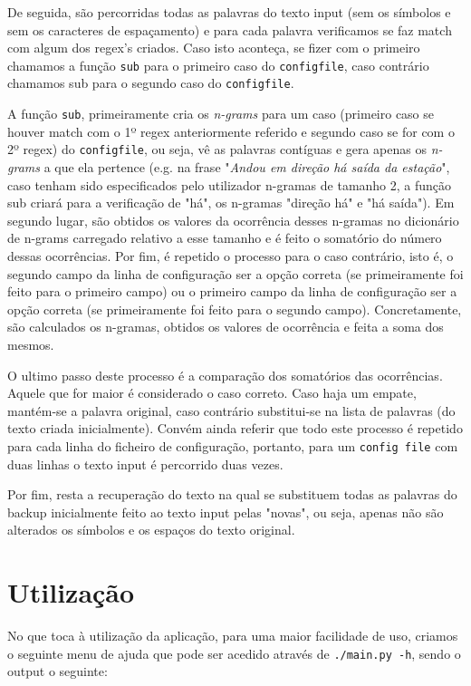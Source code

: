 \documentclass{article}
\begin{document}
De seguida, são percorridas todas as palavras do texto input (sem os símbolos e sem os caracteres de espaçamento) e para cada palavra verificamos se faz match com algum dos regex's criados. Caso isto aconteça, se fizer com o primeiro chamamos a função \texttt{sub} para o primeiro caso do \texttt{configfile}, caso contrário chamamos sub para o segundo caso do \texttt{configfile}.

A função \texttt{sub}, primeiramente cria os \textit{n-grams} para um caso (primeiro caso se houver match com o 1º regex anteriormente referido e segundo caso se for com o 2º regex) do \texttt{configfile}, ou seja, vê as palavras contíguas e gera apenas os \textit{n-grams} a que ela pertence (e.g. na frase "\textit{Andou em direção há saída da estação}", caso tenham sido especificados pelo utilizador n-gramas de tamanho 2, a função sub criará para a verificação de "há", os n-gramas "direção há" e "há saída"). Em segundo lugar, são obtidos os valores da ocorrência desses n-gramas no dicionário de n-grams carregado relativo a esse tamanho e é feito o somatório do número dessas ocorrências. Por fim, é repetido o processo para o caso contrário, isto é, o segundo campo da linha de configuração ser a opção correta (se primeiramente foi feito para o primeiro campo) ou o primeiro campo da linha de configuração ser a opção correta (se primeiramente foi feito para o segundo campo). Concretamente, são calculados os n-gramas, obtidos os valores de ocorrência e feita a soma dos mesmos.

O ultimo passo deste processo é a comparação dos somatórios das ocorrências. Aquele que for maior é considerado o caso correto. Caso haja um empate, mantém-se a palavra original, caso contrário substitui-se na lista de palavras (do texto criada inicialmente). Convém ainda referir que todo este processo é repetido para cada linha do ficheiro de configuração, portanto, para um \texttt{config file} com duas linhas o texto input é percorrido duas vezes.

Por fim, resta a recuperação do texto na qual se substituem todas as palavras do backup inicialmente feito ao texto input pelas "novas", ou seja, apenas não são alterados os símbolos e os espaços do texto original.



\section{Utilização}\label{usage}
No que toca à utilização da aplicação, para uma maior facilidade de uso, criamos o seguinte menu de ajuda que pode ser acedido através de \verb|./main.py -h|, sendo o output o seguinte:
\end{document}

